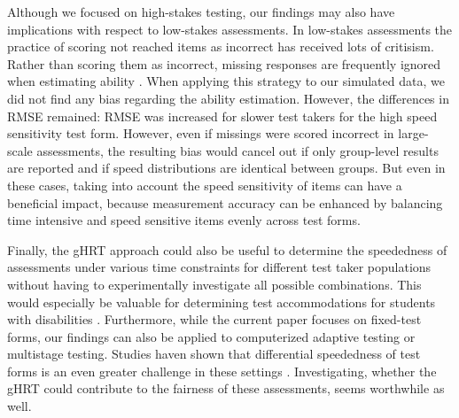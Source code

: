 \documentclass[a4paper,man,apacite,floatsintext,donotrepeattitle]{apa6}
\begin{document}
Although we focused on high-stakes testing, our findings may also have implications with respect to low-stakes assessments. In low-stakes assessments the practice of scoring not reached items as incorrect has received lots of critisism. Rather than scoring them as incorrect, missing responses are frequently ignored when estimating ability \cite{Pohl.2013}. When applying this strategy to our simulated data, we did not find any bias regarding the ability estimation. However, the differences in RMSE remained: RMSE was increased for slower test takers for the high speed sensitivity test form. However, even if missings were scored incorrect in large-scale assessments, the resulting bias would cancel out if only group-level results are reported and if speed distributions are identical between groups. But even in these cases, taking into account the speed sensitivity of items can have a beneficial impact, because measurement accuracy can be enhanced by balancing time intensive and speed sensitive items evenly across test forms. 

Finally, the gHRT approach could also be useful to determine the speededness of assessments under various time constraints for different test taker populations without having to experimentally investigate all possible combinations. This would especially be valuable for determining test accommodations for students with disabilities \cite{Lovett.2010}. Furthermore, while the current paper focuses on fixed-test forms, our findings can also be applied to computerized adaptive testing or multistage testing. Studies haven shown that differential speededness of test forms is an even greater challenge in these settings \cite{vanderLinden.2013}. Investigating, whether the gHRT could contribute to the fairness of these assessments, seems worthwhile as well.

\begin{flushleft}

\end{flushleft}
\end{document}
